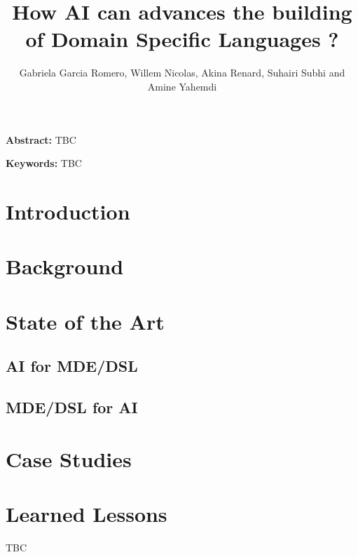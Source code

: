 \documentclass[11pt, oneside]{article}   	%
\title{\bf How AI can advances the building of Domain Specific Languages ?}
\author{Gabriela Garcia Romero, Willem Nicolas, Akina Renard, Suhairi Subhi and Amine Yahemdi }
\date{}							%
\begin{document}
\maketitle

{\noindent\small{\bf Abstract:} TBC}

\vspace{1ex}
{\noindent\small{\bf Keywords:}
   TBC}



\section{Introduction}


\section{Background}




\section{State of the Art}
\subsection{AI for MDE/DSL}


\subsection{MDE/DSL for AI}




\section{Case Studies}


\section{Learned Lessons} 
TBC




\end{document}
